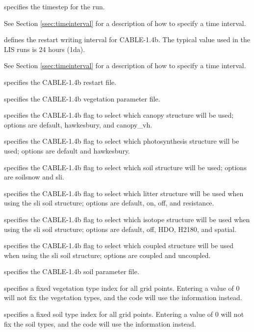  
  specifies the timestep for the run.

 See Section \ref{ssec:timeinterval} for a description
 of how to specify a time interval.

  defines the restart
 writing interval for CABLE-1.4b. The typical value used
 in the LIS runs is 24 hours (1da).

 See Section \ref{ssec:timeinterval} for a description
 of how to specify a time interval.

  specifies the CABLE-1.4b restart file.

  specifies the
 CABLE-1.4b vegetation parameter file.

  specifies the CABLE-1.4b
 flag to select which canopy structure will be used; options
 are default, hawkesbury, and canopy\_vh.

  specifies the
 CABLE-1.4b flag to select which photosynthesis structure
 will be used; options are default and hawkesbury.

  specifies the CABLE-1.4b
 flag to select which soil structure will be used; options
 are soilsnow and sli.

  specifies the
 CABLE-1.4b flag to select which litter structure will be used
 when using the sli soil structure; options are default, on,
 off, and resistance.

  specifies the
 CABLE-1.4b flag to select which isotope structure will be used
 when using the sli soil structure; options are default, off,
 HDO, H2180, and spatial.

  specifies the
 CABLE-1.4b flag to select which coupled structure will be used
 when using the sli soil structure; options are coupled and
 uncoupled.

  specifies the CABLE-1.4b
 soil parameter file.

  specifies a fixed vegetation
 type index for all grid points.  Entering a value of 0 will not
 fix the vegetation types, and the code will use the
  information instead.

  specifies a fixed soil type
 index for all grid points.  Entering a value of 0 will
 not fix the soil types, and the code will use the
  information instead.

